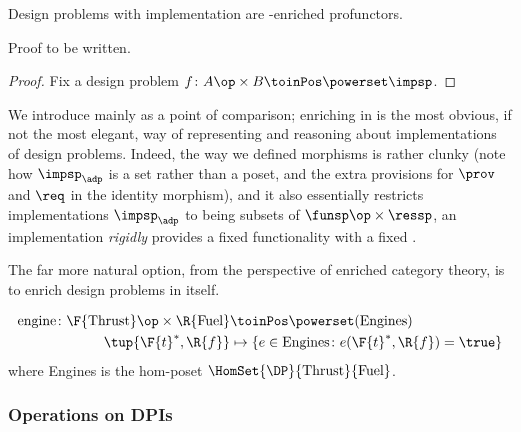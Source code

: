 \begin{proposition}
	Design problems with implementation are \Set-enriched profunctors.
\end{proposition}
\begin{publictodo}
	Proof to be written.
\end{publictodo}
\begin{proof}
	Fix a design problem $f \colon A\op \times B \toinPos \powerset \impsp$.
\end{proof}
We introduce \DPI mainly as a point of comparison; enriching in \Set is the most obvious, if not the most elegant, way of representing and reasoning about implementations of design problems.
Indeed, the way we defined morphisms is rather clunky (note how $\impsp_\adp$ is a set rather than a poset, and the extra provisions for $\prov$ and $\req$ in the identity morphism), and it also essentially restricts implementations $\impsp_\adp$ to being subsets of $\funsp\op \times \ressp$, \ie  an implementation \emph{rigidly} provides a fixed functionality \fun with a fixed \res.

The far more natural option, from the perspective of enriched category theory, is to enrich design problems in \DP itself.

\begin{example}
	\begin{equation}
		\begin{aligned}
			\text{engine} \colon \F{\text{Thrust}}\op \times \R{\text{Fuel}} & \toinPos \powerset(\text{Engines})                                  \\
			\tup{\F{t}^*,\R{f}}                                              & \mapsto \{ e \in \text{Engines} \colon e(\F{t}^*, \R{f}) = \true \}
		\end{aligned}
	\end{equation}
	where Engines is the hom-poset $\HomSet{\DP}{\text{Thrust}}{\text{Fuel}}$.
\end{example}

\subsubsection{Operations on DPIs}


